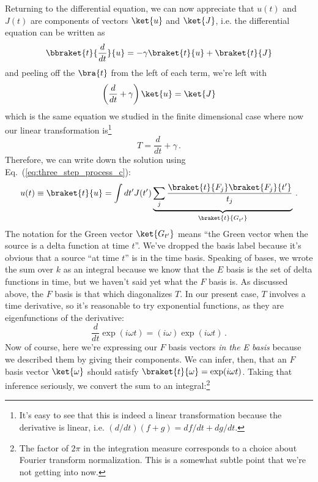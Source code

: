 Returning to the differential equation, we can now appreciate that $u(t)$ and $J(t)$ are components of vectors $\ket{u}$ and $\ket{J}$, i.e. the differential equation can be written as
\begin{equation*}
  \bbraket{t}{\frac{d}{dt}}{u} = - \gamma \braket{t}{u} + \braket{t}{J}
\end{equation*}
and peeling off the $\bra{t}$ from the left of each term, we're left with
\begin{equation}
  \left( \frac{d}{dt} + \gamma \right) \ket{u} = \ket{J}
\end{equation}
which is the same equation we studied in the finite dimensional case where now our linear transformation is\footnote{It's easy to see that this is indeed a linear transformation because the derivative is linear, i.e. $(d/dt)(f + g) = df/dt + dg/dt$.}
\begin{equation}
  T = \frac{d}{dt} + \gamma \, .
\end{equation}
Therefore, we can write down the solution using Eq.~(\ref{eq:three_step_process_c}):
\begin{equation}
  u(t) \equiv \braket{t}{u} = \int dt' J(t')
  \underbrace{\sum_j \frac{\braket{t}{F_j}\braket{F_j}{t'}}{t_j}}_{\braket{t}{G_{t'}}}
  \, .
  \label{eq:green_function_solution_mixed}
\end{equation}
The notation for the Green vector $\ket{G_{t'}}$ means ``the Green vector when the source is a delta function at time $t$''.
We've dropped the basis label because it's obvious that a source ``at time $t$'' is in the time basis.
Speaking of bases, we wrote the sum over $k$ as an integral because we know that the $E$ basis is the set of delta functions in time, but we haven't said yet what the $F$ basis is.
As discussed above, the $F$ basis is that which diagonalizes $T$.
In our present case, $T$ involves a time derivative, so it's reasonable to try exponential functions, as they are eigenfunctions of the derivative:
\begin{equation*}
  \frac{d}{dt} \exp(i \omega t) = (i \omega) \exp(i\omega t)
  \, .
\end{equation*}
Now of course, here we're expressing our $F$ basis vectors \emph{in the E basis} because we described them by giving their components.
We can infer, then, that an $F$ basis vector $\ket{\omega}$ should satisfy $\braket{t}{\omega} = \exp(i \omega t)$.
Taking that inference seriously, we convert the sum to an integral:\footnote{The factor of $2\pi$ in the integration measure corresponds to a choice about Fourier transform normalization. This is a somewhat subtle point that we're not getting into now.}
